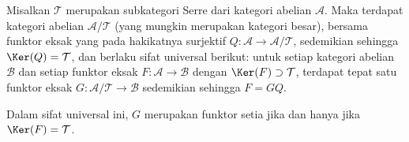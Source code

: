 \begin{teorema}\label{prop:Serre-quotient}
Misalkan $\mathcal{T}$ merupakan subkategori Serre dari kategori abelian
$\mathcal{A}$. Maka terdapat kategori abelian $\mathcal{A}/\mathcal{T}$
(yang mungkin merupakan kategori besar), bersama funktor eksak yang pada
hakikatnya surjektif $Q:\mathcal{A}\to\mathcal{A}/\mathcal{T}$, sedemikian
sehingga $\Ker(Q)=\mathcal{T}$, dan berlaku sifat universal berikut: untuk
setiap kategori abelian $\mathcal{B}$ dan setiap funktor eksak
$F:\mathcal{A}\to\mathcal{B}$ dengan $\Ker(F)\supset\mathcal{T}$, terdapat
tepat satu funktor eksak $G:\mathcal{A}/\mathcal{T}\to\mathcal{B}$
sedemikian sehingga $F=GQ$.

Dalam sifat universal ini, $G$ merupakan funktor setia jika dan hanya jika
$\Ker(F)=\mathcal{T}$.
\end{teorema}


